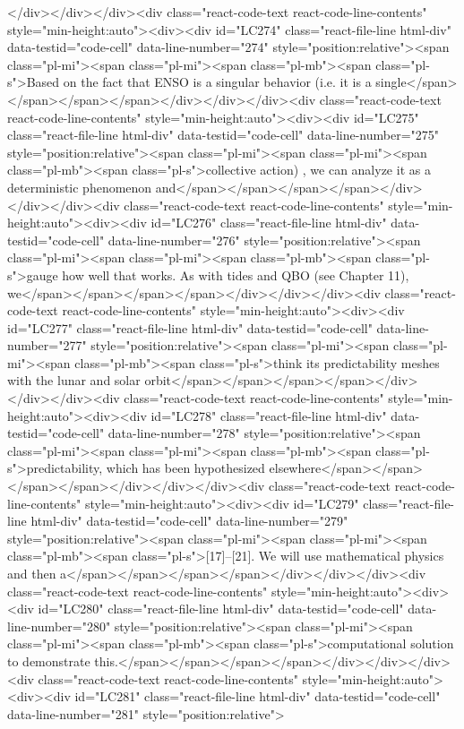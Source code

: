 {{{</div></div></div><div class="react-code-text react-code-line-contents" style="min-height:auto"><div><div id="LC274" class="react-file-line html-div" data-testid="code-cell" data-line-number="274" style="position:relative"><span class="pl-mi"><span class="pl-mi"><span class="pl-mb"><span class="pl-s">Based on the fact that ENSO is a singular behavior (i.e. it is a single</span></span></span></span></div></div></div><div class="react-code-text react-code-line-contents" style="min-height:auto"><div><div id="LC275" class="react-file-line html-div" data-testid="code-cell" data-line-number="275" style="position:relative"><span class="pl-mi"><span class="pl-mi"><span class="pl-mb"><span class="pl-s">collective action) , we can analyze it as a deterministic phenomenon and</span></span></span></span></div></div></div><div class="react-code-text react-code-line-contents" style="min-height:auto"><div><div id="LC276" class="react-file-line html-div" data-testid="code-cell" data-line-number="276" style="position:relative"><span class="pl-mi"><span class="pl-mi"><span class="pl-mb"><span class="pl-s">gauge how well that works. As with tides and QBO (see Chapter 11), we</span></span></span></span></div></div></div><div class="react-code-text react-code-line-contents" style="min-height:auto"><div><div id="LC277" class="react-file-line html-div" data-testid="code-cell" data-line-number="277" style="position:relative"><span class="pl-mi"><span class="pl-mi"><span class="pl-mb"><span class="pl-s">think its predictability meshes with the lunar and solar orbit</span></span></span></span></div></div></div><div class="react-code-text react-code-line-contents" style="min-height:auto"><div><div id="LC278" class="react-file-line html-div" data-testid="code-cell" data-line-number="278" style="position:relative"><span class="pl-mi"><span class="pl-mi"><span class="pl-mb"><span class="pl-s">predictability, which has been hypothesized elsewhere</span></span></span></span></div></div></div><div class="react-code-text react-code-line-contents" style="min-height:auto"><div><div id="LC279" class="react-file-line html-div" data-testid="code-cell" data-line-number="279" style="position:relative"><span class="pl-mi"><span class="pl-mi"><span class="pl-mb"><span class="pl-s">{[}17{]}--{[}21{]}. We will use mathematical physics and then a</span></span></span></span></div></div></div><div class="react-code-text react-code-line-contents" style="min-height:auto"><div><div id="LC280" class="react-file-line html-div" data-testid="code-cell" data-line-number="280" style="position:relative"><span class="pl-mi"><span class="pl-mi"><span class="pl-mb"><span class="pl-s">computational solution to demonstrate this.</span></span></span></span></div></div></div><div class="react-code-text react-code-line-contents" style="min-height:auto"><div><div id="LC281" class="react-file-line html-div" data-testid="code-cell" data-line-number="281" style="position:relative">
}}}
